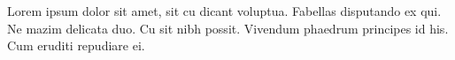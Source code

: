 \documentclass[letterpaper,10pt]{article}
\begin{document}
Lorem ipsum dolor sit amet, sit cu dicant voluptua. Fabellas disputando ex qui. Ne mazim delicata duo. Cu sit nibh possit. Vivendum phaedrum principes id his. Cum eruditi repudiare ei.

\end{document}
